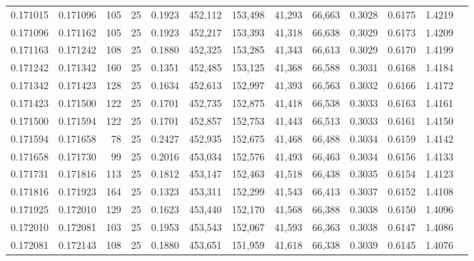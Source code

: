 \begin{tabular}{rrrrrrrrrrrrr}
0.171015 & 0.171096 &   105 &  25 &                                     0.1923 & 452,112 & 153,498 &  41,293 &  66,663 & 0.3028 & 0.6175 & 1.4219 \\
0.171096 & 0.171162 &   105 &  25 &                                     0.1923 & 452,217 & 153,393 &  41,318 &  66,638 & 0.3029 & 0.6173 & 1.4209 \\
0.171163 & 0.171242 &   108 &  25 &                                     0.1880 & 452,325 & 153,285 &  41,343 &  66,613 & 0.3029 & 0.6170 & 1.4199 \\
0.171242 & 0.171342 &   160 &  25 &                                     0.1351 & 452,485 & 153,125 &  41,368 &  66,588 & 0.3031 & 0.6168 & 1.4184 \\
0.171342 & 0.171423 &   128 &  25 &                                     0.1634 & 452,613 & 152,997 &  41,393 &  66,563 & 0.3032 & 0.6166 & 1.4172 \\
0.171423 & 0.171500 &   122 &  25 &                                     0.1701 & 452,735 & 152,875 &  41,418 &  66,538 & 0.3033 & 0.6163 & 1.4161 \\
0.171500 & 0.171594 &   122 &  25 &                                     0.1701 & 452,857 & 152,753 &  41,443 &  66,513 & 0.3033 & 0.6161 & 1.4150 \\
0.171594 & 0.171658 &    78 &  25 &                                     0.2427 & 452,935 & 152,675 &  41,468 &  66,488 & 0.3034 & 0.6159 & 1.4142 \\
0.171658 & 0.171730 &    99 &  25 &                                     0.2016 & 453,034 & 152,576 &  41,493 &  66,463 & 0.3034 & 0.6156 & 1.4133 \\
0.171731 & 0.171816 &   113 &  25 &                                     0.1812 & 453,147 & 152,463 &  41,518 &  66,438 & 0.3035 & 0.6154 & 1.4123 \\
0.171816 & 0.171923 &   164 &  25 &                                     0.1323 & 453,311 & 152,299 &  41,543 &  66,413 & 0.3037 & 0.6152 & 1.4108 \\
0.171925 & 0.172010 &   129 &  25 &                                     0.1623 & 453,440 & 152,170 &  41,568 &  66,388 & 0.3038 & 0.6150 & 1.4096 \\
0.172010 & 0.172081 &   103 &  25 &                                     0.1953 & 453,543 & 152,067 &  41,593 &  66,363 & 0.3038 & 0.6147 & 1.4086 \\
0.172081 & 0.172143 &   108 &  25 &                                     0.1880 & 453,651 & 151,959 &  41,618 &  66,338 & 0.3039 & 0.6145 & 1.4076 \\

\end{tabular}
